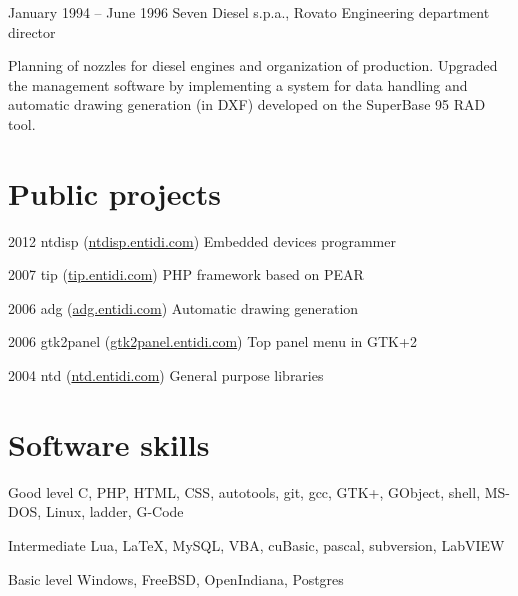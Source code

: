 \documentclass{tccv}
\begin{document}
\begin{eventlist}
\item{January 1994 -- June 1996}
     {Seven Diesel s.p.a., Rovato}
     {Engineering department director}

Planning of nozzles for diesel engines and organization of production.
Upgraded the management software by implementing a system for data
handling and automatic drawing generation (in DXF) developed on the
SuperBase 95 RAD tool.

\end{eventlist}







\section{Public projects}

\begin{yearlist}

\item{2012}
     {ntdisp (\href{http://ntdisp.entidi.com/}{ntdisp.entidi.com})}
     {Embedded devices programmer}

\item{2007}
     {tip (\href{http://tip.entidi.com/}{tip.entidi.com})}
     {PHP framework based on PEAR}

\item{2006}
     {adg (\href{http://adg.entidi.com/}{adg.entidi.com})}
     {Automatic drawing generation}

\item{2006}
     {gtk2panel (\href{http://gtk2panel.entidi.com/}{gtk2panel.entidi.com})}
     {Top panel menu in GTK+2}

\item{2004}
     {ntd (\href{http://ntd.entidi.com/}{ntd.entidi.com})}
     {General purpose libraries}

\end{yearlist}







\section{Software skills}

\begin{factlist}

\item{Good level}
     {C, PHP, HTML, CSS, autotools, git, gcc, GTK+, GObject, shell,
      MS-DOS, Linux, ladder, G-Code}

\item{Intermediate}
     {Lua, \LaTeX, MySQL, VBA, cuBasic, pascal, subversion, LabVIEW}

\item{Basic level}
     {Windows, FreeBSD, OpenIndiana, Postgres}

\end{factlist}
\end{document}
